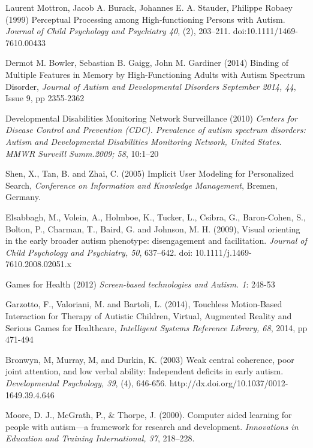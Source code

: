 \documentclass[a4paper, 10pt]{article}
\begin{document}
\begin{thebibliography}{100}

 Laurent Mottron, Jacob A. Burack, Johannes E. A. Stauder, Philippe Robaey (1999) Perceptual Processing among High-functioning Persons with Autism. \textit{Journal of Child Psychology and Psychiatry 40}, (2), 203–211. doi:10.1111/1469-7610.00433

Dermot M. Bowler, Sebastian B. Gaigg, John M. Gardiner (2014) Binding of Multiple Features in Memory by High-Functioning Adults with Autism Spectrum Disorder, \textit{Journal of Autism and Developmental Disorders September 2014, 44}, Issue 9, pp 2355-2362

Developmental Disabilities Monitoring Network Surveillance (2010) \textit{Centers for Disease Control and Prevention (CDC). Prevalence of autism spectrum disorders: Autism and Developmental Disabilities Monitoring Network, United States. MMWR Surveill Summ.2009; 58}, 10:1–20

Shen, X., Tan, B. and Zhai, C. (2005) Implicit User Modeling for Personalized Search, \textit{Conference on Information and Knowledge Management}, Bremen, Germany.

Elsabbagh, M., Volein, A., Holmboe, K., Tucker, L., Csibra, G., Baron-Cohen, S., Bolton, P., Charman, T., Baird, G. and Johnson, M. H. (2009), Visual orienting in the early broader autism phenotype: disengagement and facilitation. \textit{Journal of Child Psychology and Psychiatry, 50}, 637–642. doi: 10.1111/j.1469-7610.2008.02051.x

 Games for Health (2012) \textit{Screen-based technologies and Autism. 1}: 248-53

 Garzotto, F., Valoriani, M. and Bartoli, L. (2014), Touchless Motion-Based Interaction for Therapy of Autistic Children, Virtual, Augmented Reality and Serious Games for Healthcare, \textit{Intelligent Systems Reference Library, 68}, 2014, pp 471-494

 Bronwyn, M, Murray, M, and Durkin, K. (2003) Weak central coherence, poor joint attention, and low verbal ability: Independent deficits in early autism. \textit{Developmental Psychology, 39}, (4), 646-656. http://dx.doi.org/10.1037/0012-1649.39.4.646

Moore, D. J., McGrath, P., \& Thorpe, J. (2000). Computer aided learning for people with autism—a framework for research and development. \textit{Innovations in Education and Training International, 37}, 218–228.


\end{thebibliography}
\end{document}
